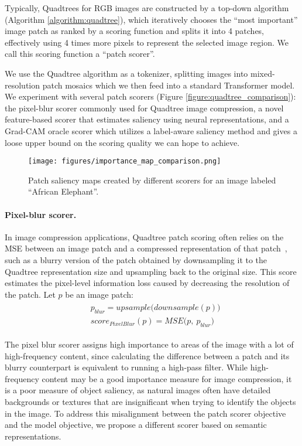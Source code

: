 Typically, Quadtrees for RGB images are constructed by a top-down algorithm (Algorithm \ref{algorithm:quadtree}), which iteratively chooses the ``most important'' image patch as ranked by a scoring function and splits it into 4 patches, effectively using 4 times more pixels to represent the selected image region. We call this scoring function a ``patch scorer''.

We use the Quadtree algorithm as a tokenizer, splitting images into mixed-resolution patch mosaics which we then feed into a standard Transformer model. We experiment with several patch scorers (Figure \ref{figure:quadtree_comparison}): the pixel-blur scorer commonly used for Quadtree image compression, a novel feature-based scorer that estimates saliency using neural representations, and a Grad-CAM oracle scorer which utilizes a label-aware saliency method and gives a loose upper bound on the scoring quality we can hope to achieve.


\begin{figure}[t!]
  \centering
  \vspace*{-12pt}
  \texttt{[image: figures/importance\_map\_comparison.png]}
  \caption{Patch saliency maps created by different scorers for an image labeled ``African Elephant''.}
  \label{figure:importance_map_comparison}
\end{figure}


\paragraph{Pixel-blur scorer.} In image compression applications, Quadtree patch scoring often relies on the MSE between an image patch and a compressed representation of that patch~\cite{Markas1992QuadTS}, such as a blurry version of the patch obtained by downsampling it to the Quadtree representation size and upsampling back to the original size. This score estimates the pixel-level information loss caused by decreasing the resolution of the patch. Let $p$ be an image patch:
\begin{align}
\begin{aligned}
&p_{blur} = upsample \bigl( downsample(p) \bigr) \\
&score_{PixelBlur}(p) = MSE \bigl( p,\ p_{blur} \bigr)
\end{aligned}
\label{equation:pixel_blur_scorer}
\end{align}

The pixel blur scorer assigns high importance to areas of the image with a lot of high-frequency content, since calculating the difference between a patch and its blurry counterpart is equivalent to running a high-pass filter. While high-frequency content may be a good importance measure for image compression, it is a poor measure of object saliency, as natural images often have detailed backgrounds or textures that are insignificant when trying to identify the objects in the image. To address this misalignment between the patch scorer objective and the model objective, we propose a different scorer based on semantic representations.



